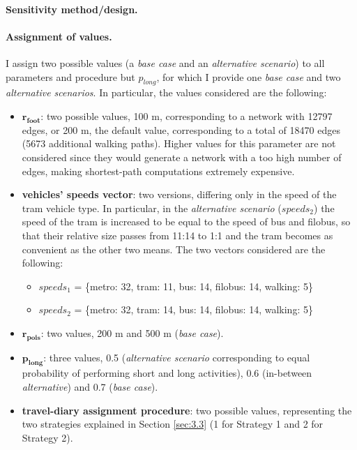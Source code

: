 \paragraph{Sensitivity method/design.}


\paragraph{Assignment of values.}
I assign two possible values (a \textit{base case} and an \textit{alternative scenario}) to all parameters and procedure but $p_{long}$, for which I provide one \textit{base case} and two \textit{alternative scenarios}. In particular, the values considered are the following:
\begin{itemize}
    \item $\mathbf{r_{foot}}$: two possible values, 100 m, corresponding to a network with 12797 edges, or 200 m, the default value, corresponding to a total of 18470 edges (5673 additional walking paths). Higher values for this parameter are not considered since they would generate a network with a too high number of edges, making shortest-path computations extremely expensive.
    \item \textbf{vehicles' speeds vector}: two versions, differing only in the speed of the tram vehicle type. In particular, in the \textit{alternative scenario} ($speeds_2$) the speed of the tram is increased to be equal to the speed of bus and filobus, so that their relative size passes from 11:14 to 1:1 and the tram becomes as convenient as the other two means. The two vectors considered are the following:
            \begin{itemize}
                \item $speeds_1$ = \{metro: 32, tram: 11, bus: 14, filobus: 14, walking: 5\}
                \item $speeds_2$ = \{metro: 32, tram: 14, bus: 14, filobus: 14, walking: 5\}
            \end{itemize}
    \item $\mathbf{r_{pois}}$: two values, 200 m and 500 m (\textit{base case}). 
    \item $\mathbf{p_{long}}$: three values, 0.5 (\textit{alternative scenario} corresponding to equal probability of performing short and long activities), 0.6 (in-between \textit{alternative}) and 0.7 (\textit{base case}).
    \item \textbf{travel-diary assignment procedure}: two possible values, representing the two strategies explained in Section \ref{sec:3.3} (1 for Strategy 1 and 2 for Strategy 2).
\end{itemize}

